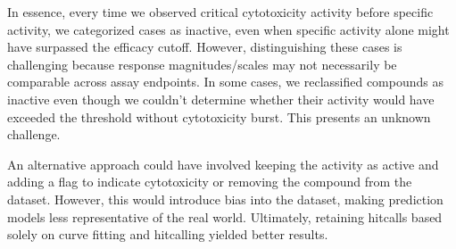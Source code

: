 In essence, every time we observed critical cytotoxicity activity before specific activity, we categorized cases as inactive, even when specific activity alone might have surpassed the efficacy cutoff. However, distinguishing these cases is challenging because response magnitudes/scales may not necessarily be comparable across assay endpoints. In some cases, we reclassified compounds as inactive even though we couldn't determine whether their activity would have exceeded the threshold without cytotoxicity burst. This presents an unknown challenge.

An alternative approach could have involved keeping the activity as active and adding a flag to indicate cytotoxicity or removing the compound from the dataset. However, this would introduce bias into the dataset, making prediction models less representative of the real world. Ultimately, retaining hitcalls based solely on curve fitting and hitcalling yielded better results.